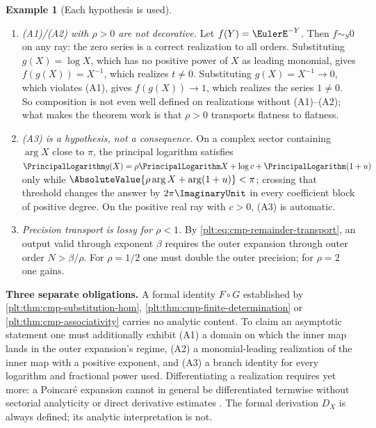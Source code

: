 \documentclass[11pt,oneside]{article}
\theoremstyle{plain}
\theoremstyle{definition}
\newtheorem{example}[theorem]{Example}
\theoremstyle{remark}
\newcommand{\DX}{D_{X}}                                  %
\newcommand{\compose}{\mathbin{\circ}}
\begin{document}
\begin{example}[Each hypothesis is used]\label{plt:ex:cmp-analytic-failures}
\begin{enumerate}
\item \emph{(A1)/(A2) with \(\rho>0\) are not decorative.}  Let
\(f(Y)=\EulerE^{-Y}\).  Then \(f\sim_{S}0\) on any ray: the zero series is a
correct realization to all orders.  Substituting \(g(X)=\log X\), which has no
positive power of \(X\) as leading monomial, gives
\(f(g(X))=X^{-1}\), which realizes \(t\ne0\).  Substituting
\(g(X)=X^{-1}\to0\), which violates (A1), gives
\(f(g(X))\to1\), which realizes the series \(1\ne0\).  So composition is not
even well defined on realizations without (A1)--(A2); what makes the theorem
work is that \(\rho>0\) transports flatness to flatness.
\item \emph{(A3) is a hypothesis, not a consequence.}  On a complex sector
containing \(\arg X\) close to \(\pi\), the principal logarithm satisfies
\(\PrincipalLogarithm g(X)=\rho\PrincipalLogarithm X+\log c
 +\PrincipalLogarithm(1+u)\) only while
\(\AbsoluteValue{\rho\arg X+\arg(1+u)}<\pi\); crossing that threshold changes
the answer by \(2\pi\ImaginaryUnit\) in every coefficient block of positive
degree.  On the positive real ray with \(c>0\), (A3) is automatic.
\item \emph{Precision transport is lossy for \(\rho<1\).}  By
\eqref{plt:eq:cmp-remainder-transport}, an output valid through exponent
\(\beta\) requires the outer expansion through outer order \(N>\beta/\rho\).
For \(\rho=1/2\) one must double the outer precision; for \(\rho=2\) one gains.
\end{enumerate}
\end{example}

\begin{warningbox}
\textbf{Three separate obligations.}  A formal identity
\(F\compose G\) established by \cref{plt:thm:cmp-substitution-hom},
\cref{plt:thm:cmp-finite-determination} or
\cref{plt:thm:cmp-associativity} carries no
analytic content.  To claim an asymptotic statement one must additionally
exhibit (A1) a domain on which the inner map lands in the outer expansion's
regime, (A2) a monomial-leading realization of the inner map with a positive
exponent, and (A3) a branch identity for every logarithm and fractional power
used.  Differentiating a realization requires yet more: a Poincar\'e expansion
cannot in general be differentiated termwise without sectorial analyticity or
direct derivative estimates \cite{olver-asymptotics,debruijn}.  The formal
derivation \(\DX\) is always defined; its analytic interpretation is not.
\end{warningbox}
\end{document}
